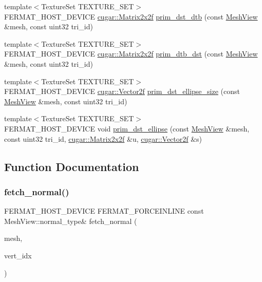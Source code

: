 \begin{DoxyCompactItemize}
{\footnotesize template$<$Texture\+Set T\+E\+X\+T\+U\+R\+E\+\_\+\+S\+ET$>$ }\\F\+E\+R\+M\+A\+T\+\_\+\+H\+O\+S\+T\+\_\+\+D\+E\+V\+I\+CE \hyperlink{structcugar_1_1_matrix}{cugar\+::\+Matrix2x2f} \hyperlink{group___mesh_module_gabdd7256342c1bcd89f9d790432243a3c}{prim\+\_\+dst\+\_\+dtb} (const \hyperlink{struct_mesh_view}{Mesh\+View} \&mesh, const uint32 tri\+\_\+id)
\item 
{\footnotesize template$<$Texture\+Set T\+E\+X\+T\+U\+R\+E\+\_\+\+S\+ET$>$ }\\F\+E\+R\+M\+A\+T\+\_\+\+H\+O\+S\+T\+\_\+\+D\+E\+V\+I\+CE \hyperlink{structcugar_1_1_matrix}{cugar\+::\+Matrix2x2f} \hyperlink{group___mesh_module_gac9ed44b788a4504434b1da004f987b8b}{prim\+\_\+dtb\+\_\+dst} (const \hyperlink{struct_mesh_view}{Mesh\+View} \&mesh, const uint32 tri\+\_\+id)
\item 
{\footnotesize template$<$Texture\+Set T\+E\+X\+T\+U\+R\+E\+\_\+\+S\+ET$>$ }\\F\+E\+R\+M\+A\+T\+\_\+\+H\+O\+S\+T\+\_\+\+D\+E\+V\+I\+CE \hyperlink{structcugar_1_1_vector}{cugar\+::\+Vector2f} \hyperlink{group___mesh_module_gadff3b3290f88aeb4dc6e3734c36d76bb}{prim\+\_\+dst\+\_\+ellipse\+\_\+size} (const \hyperlink{struct_mesh_view}{Mesh\+View} \&mesh, const uint32 tri\+\_\+id)
\item 
{\footnotesize template$<$Texture\+Set T\+E\+X\+T\+U\+R\+E\+\_\+\+S\+ET$>$ }\\F\+E\+R\+M\+A\+T\+\_\+\+H\+O\+S\+T\+\_\+\+D\+E\+V\+I\+CE void \hyperlink{group___mesh_module_ga26c332905023bcaa1134263884b75d96}{prim\+\_\+dst\+\_\+ellipse} (const \hyperlink{struct_mesh_view}{Mesh\+View} \&mesh, const uint32 tri\+\_\+id, \hyperlink{structcugar_1_1_matrix}{cugar\+::\+Matrix2x2f} \&u, \hyperlink{structcugar_1_1_vector}{cugar\+::\+Vector2f} \&s)
\end{DoxyCompactItemize}


\subsection{Function Documentation}
\mbox{\label{group___mesh_module_ga2d3d06537c1b2fc31399190bd353f6e6}} 
\subsubsection{\texorpdfstring{fetch\+\_\+normal()}{fetch\_normal()}}
{\footnotesize\ttfamily F\+E\+R\+M\+A\+T\+\_\+\+H\+O\+S\+T\+\_\+\+D\+E\+V\+I\+CE F\+E\+R\+M\+A\+T\+\_\+\+F\+O\+R\+C\+E\+I\+N\+L\+I\+NE const Mesh\+View\+::normal\+\_\+type\& fetch\+\_\+normal (\begin{DoxyParamCaption}\item[{const \hyperlink{struct_mesh_view}{Mesh\+View} \&}]{mesh,  }\item[{const uint32}]{vert\+\_\+idx }\end{DoxyParamCaption})}

